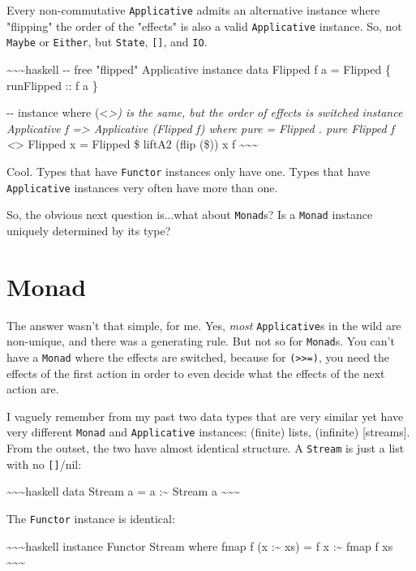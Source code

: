 \documentclass[]{article}
\begin{document}
Every non-commutative \texttt{Applicative} admits an alternative instance where
"flipping" the order of the "effects" is also a valid \texttt{Applicative}
instance. So, not \texttt{Maybe} or \texttt{Either}, but \texttt{State},
\texttt{{[}{]}}, and \texttt{IO}.

\textasciitilde{}\textasciitilde{}\textasciitilde{}haskell -\/- free "flipped"
Applicative instance data Flipped f a = Flipped \{ runFlipped :: f a \}

-\/- instance where (\textless{}\emph{\textgreater{}) is the same, but the order
of effects is switched instance Applicative f =\textgreater{} Applicative
(Flipped f) where pure = Flipped . pure Flipped f \textless{}}\textgreater{}
Flipped x = Flipped \$ liftA2 (flip (\$)) x f
\textasciitilde{}\textasciitilde{}\textasciitilde{}

Cool. Types that have \texttt{Functor} instances only have one. Types that have
\texttt{Applicative} instances very often have more than one.

So, the obvious next question is...what about \texttt{Monad}s? Is a
\texttt{Monad} instance uniquely determined by its type?

\section{Monad}

The answer wasn't that simple, for me. Yes, \emph{most} \texttt{Applicative}s in
the wild are non-unique, and there was a generating rule. But not so for
\texttt{Monad}s. You can't have a \texttt{Monad} where the effects are switched,
because for \texttt{(\textgreater{}\textgreater{}=)}, you need the effects of
the first action in order to even decide what the effects of the next action
are.

I vaguely remember from my past two data types that are very similar yet have
very different \texttt{Monad} and \texttt{Applicative} instances: (finite)
lists, (infinite) {[}streams{]}. From the outset, the two have almost identical
structure. A \texttt{Stream} is just a list with no \texttt{{[}{]}}/nil:

\textasciitilde{}\textasciitilde{}\textasciitilde{}haskell data Stream a = a
:\textasciitilde{} Stream a \textasciitilde{}\textasciitilde{}\textasciitilde{}

The \texttt{Functor} instance is identical:

\textasciitilde{}\textasciitilde{}\textasciitilde{}haskell instance Functor
Stream where fmap f (x :\textasciitilde{} xs) = f x :\textasciitilde{} fmap f xs
\textasciitilde{}\textasciitilde{}\textasciitilde{}
\end{document}
